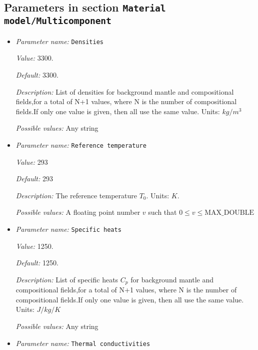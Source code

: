 \subsection{Parameters in section \tt Material model/Multicomponent}
\label{parameters:Material_20model/Multicomponent}

\begin{itemize}
\item {\it Parameter name:} {\tt Densities}
\label{parameters:Material model/Multicomponent/Densities}


{\it Value:} 3300.


{\it Default:} 3300.


{\it Description:} List of densities for background mantle and compositional fields,for a total of N+1 values, where N is the number of compositional fields.If only one value is given, then all use the same value.  Units: $kg / m^3$


{\it Possible values:} Any string
\item {\it Parameter name:} {\tt Reference temperature}
\label{parameters:Material model/Multicomponent/Reference temperature}


{\it Value:} 293


{\it Default:} 293


{\it Description:} The reference temperature $T_0$. Units: $K$.


{\it Possible values:} A floating point number $v$ such that $0 \leq v \leq \text{MAX\_DOUBLE}$
\item {\it Parameter name:} {\tt Specific heats}
\label{parameters:Material model/Multicomponent/Specific heats}


{\it Value:} 1250.


{\it Default:} 1250.


{\it Description:} List of specific heats $C_p$ for background mantle and compositional fields,for a total of N+1 values, where N is the number of compositional fields.If only one value is given, then all use the same value. Units: $J /kg /K$


{\it Possible values:} Any string
\item {\it Parameter name:} {\tt Thermal conductivities}
\label{parameters:Material model/Multicomponent/Thermal conductivities}



\end{itemize}
